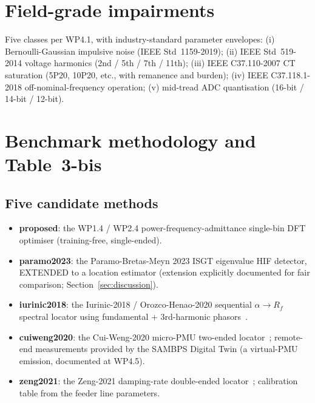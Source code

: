 \documentclass[journal]{IEEEtran}
\begin{document}
\section{Field-grade impairments}\label{sec:impair}
Five classes per WP4.1, with industry-standard parameter envelopes:
(i) Bernoulli-Gaussian impulsive noise (IEEE Std~1159-2019);
(ii) IEEE Std~519-2014 voltage harmonics (2nd / 5th / 7th / 11th);
(iii) IEEE C37.110-2007 CT saturation (5P20, 10P20, etc., with
remanence and burden);
(iv) IEEE C37.118.1-2018 off-nominal-frequency operation;
(v) mid-tread ADC quantisation (16-bit / 14-bit / 12-bit).

\section{Benchmark methodology and Table~3-bis}\label{sec:table3bis}

\subsection{Five candidate methods}
\begin{itemize}
\item \textbf{proposed}: the WP1.4 / WP2.4 power-frequency-admittance
      single-bin DFT optimiser (training-free, single-ended).
\item \textbf{paramo2023}: the Paramo-Bretas-Meyn 2023 ISGT
      eigenvalue HIF detector, EXTENDED to a location estimator
      (extension explicitly documented for fair comparison;
      Section~\ref{sec:discussion}).
\item \textbf{iurinic2018}: the Iurinic-2018 / Orozco-Henao-2020
      sequential $\alpha \to R_f$ spectral locator using fundamental
      + 3rd-harmonic phasors~\cite{Iurinic2018IJEPES,
      OrozcoHenao2020EPSR}.
\item \textbf{cuiweng2020}: the Cui-Weng-2020 micro-PMU two-ended
      locator~\cite{CuiWeng2020TSG}; remote-end measurements provided
      by the SAMBPS Digital Twin (a virtual-PMU emission, documented
      at WP4.5).
\item \textbf{zeng2021}: the Zeng-2021 damping-rate double-ended
      locator~\cite{Zeng2021EPSR}; calibration table from the
      feeder line parameters.
\end{itemize}
\end{document}
